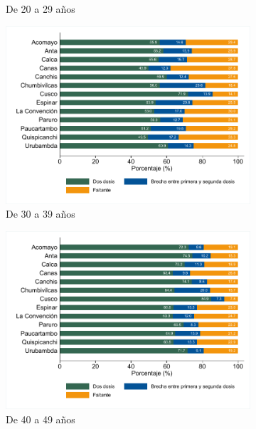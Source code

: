 \documentclass[12pt,a4paper,openany]{book}
\begin{document}
\begin{figure}[h]
\begin{subfigure}[b]{0.45\textwidth}
		\caption{De 20 a 29 años}
	\end{subfigure}
	\begin{subfigure}[b]{0.45\textwidth}
		\centering
		\includegraphics[width=\textwidth]{../figuras/vacunacion_provincial_edad_3}
		\caption{De 30 a 39 años}
	\end{subfigure}
	\hfill
	\begin{subfigure}[b]{0.45\textwidth}
		\centering
		\includegraphics[width=\textwidth]{../figuras/vacunacion_provincial_edad_4}
		\caption{De 40 a 49 años}
	\end{subfigure}
	\begin{subfigure}[b]{0.45\textwidth}
		\centering

\end{subfigure}
\end{figure}
\end{document}
